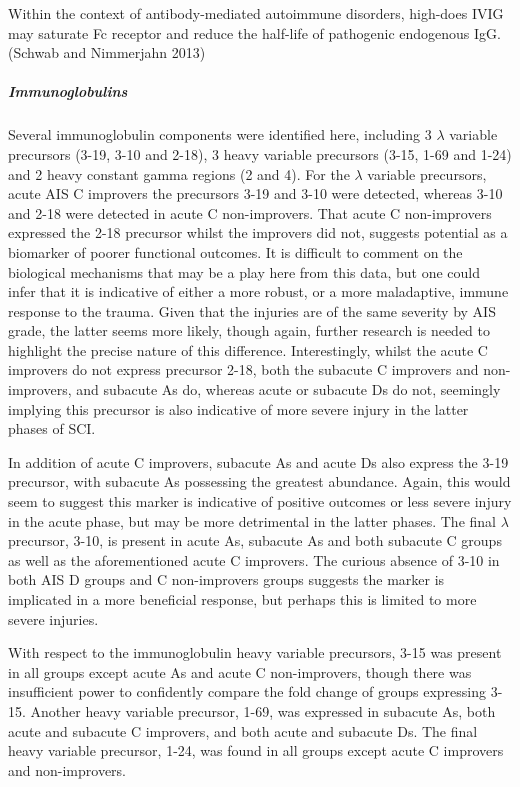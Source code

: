 \documentclass[9pt,lineno]{elife}
\begin{document}
\begin{landscape}
\begin{landscape}
Within the context of antibody-mediated autoimmune disorders, high-does IVIG may saturate Fc receptor and reduce the half-life of pathogenic endogenous IgG.(Schwab and Nimmerjahn 2013)

\hypertarget{immunoglobulins}{%
\subparagraph{Immunoglobulins}\label{immunoglobulins}}

Several immunoglobulin components were identified here, including 3 \(\lambda\) variable precursors (3-19, 3-10 and 2-18), 3 heavy variable precursors (3-15, 1-69 and 1-24) and 2 heavy constant gamma regions (2 and 4).
For the \(\lambda\) variable precursors, acute AIS C improvers the precursors 3-19 and 3-10 were detected, whereas 3-10 and 2-18 were detected in acute C non-improvers.
That acute C non-improvers expressed the 2-18 precursor whilst the improvers did not, suggests potential as a biomarker of poorer functional outcomes.
It is difficult to comment on the biological mechanisms that may be a play here from this data, but one could infer that it is indicative of either a more robust, or a more maladaptive, immune response to the trauma.
Given that the injuries are of the same severity by AIS grade, the latter seems more likely, though again, further research is needed to highlight the precise nature of this difference.
Interestingly, whilst the acute C improvers do not express precursor 2-18, both the subacute C improvers and non-improvers, and subacute As do, whereas acute or subacute Ds do not, seemingly implying this precursor is also indicative of more severe injury in the latter phases of SCI.

In addition of acute C improvers, subacute As and acute Ds also express the 3-19 precursor, with subacute As possessing the greatest abundance.
Again, this would seem to suggest this marker is indicative of positive outcomes or less severe injury in the acute phase, but may be more detrimental in the latter phases.
The final \(\lambda\) precursor, 3-10, is present in acute As, subacute As and both subacute C groups as well as the aforementioned acute C improvers.
The curious absence of 3-10 in both AIS D groups and C non-improvers groups suggests the marker is implicated in a more beneficial response, but perhaps this is limited to more severe injuries.

With respect to the immunoglobulin heavy variable precursors, 3-15 was present in all groups except acute As and acute C non-improvers, though there was insufficient power to confidently compare the fold change of groups expressing 3-15.
Another heavy variable precursor, 1-69, was expressed in subacute As, both acute and subacute C improvers, and both acute and subacute Ds.
The final heavy variable precursor, 1-24, was found in all groups except acute C improvers and non-improvers.


\end{landscape}
\end{landscape}
\end{document}
